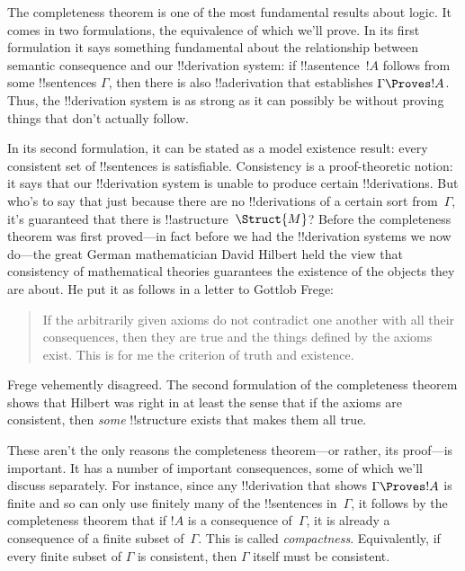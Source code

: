 




The completeness theorem is one of the most fundamental results about
logic.  It comes in two formulations, the equivalence of which we'll
prove.  In its first formulation it says something fundamental about
the relationship between semantic consequence and our !!{derivation}
system: if !!a{sentence}~$!A$ follows from some !!{sentence}s
$\Gamma$, then there is also !!a{derivation} that establishes $\Gamma
\Proves !A$. Thus, the !!{derivation} system is as strong as it can
possibly be without proving things that don't actually follow.

In its second formulation, it can be stated as a model existence
result: every consistent set of !!{sentence}s is satisfiable.
Consistency is a proof-theoretic notion: it says that our
!!{derivation} system is unable to produce certain !!{derivation}s.
But who's to say that just because there are no !!{derivation}s of a
certain sort from~$\Gamma$, it's guaranteed that there is
!!a{structure}~$\Struct{M}$? Before the
completeness theorem was first proved---in fact before we had the
!!{derivation} systems we now do---the great German mathematician
David Hilbert held the view that consistency of mathematical theories
guarantees the existence of the objects they are about. He put it as
follows in a letter to Gottlob Frege:
\begin{quote}
  If the arbitrarily given axioms do not contradict one another with
  all their consequences, then they are true and the things defined by
  the axioms exist. This is for me the criterion of truth and
  existence. 
\end{quote}
Frege vehemently disagreed. The second formulation of the completeness
theorem shows that Hilbert was right in at least the sense that if the
axioms are consistent, then \emph{some}
!!{structure} exists that makes them all
true.

These aren't the only reasons the completeness theorem---or rather,
its proof---is important.  It has a number of important consequences,
some of which we'll discuss separately.  For instance, since any
!!{derivation} that shows $\Gamma \Proves !A$ is finite and so can
only use finitely many of the !!{sentence}s in~$\Gamma$, it follows by
the completeness theorem that if $!A$ is a consequence of~$\Gamma$, it
is already a consequence of a finite subset of~$\Gamma$.  This is
called \emph{compactness}.  Equivalently, if every finite subset of
$\Gamma$ is consistent, then $\Gamma$ itself must be consistent.

